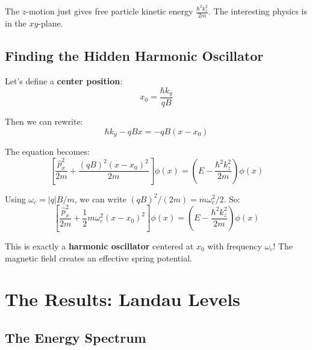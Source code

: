 \documentclass[11pt,a4paper]{article}
\let\oldsection\section
\renewcommand{\section}{\needspace{5\baselineskip}\oldsection}
\let\oldsubsection\subsection
\renewcommand{\subsection}{\needspace{4\baselineskip}\oldsubsection}
\theoremstyle{definition}
\theoremstyle{remark}
\begin{document}
The $z$-motion just gives free particle kinetic energy $\frac{\hbar^2 k_z^2}{2m}$. The interesting physics is in the $xy$-plane.

\subsection{Finding the Hidden Harmonic Oscillator}

Let's define a \textbf{center position}:
\begin{equation}
    x_0 = \frac{\hbar k_y}{qB}
\end{equation}

Then we can rewrite:
\begin{equation}
    \hbar k_y - qBx = -qB(x - x_0)
\end{equation}

The equation becomes:
\begin{equation}
    \left[\frac{\hat{p}_x^2}{2m} + \frac{(qB)^2(x - x_0)^2}{2m}\right]\phi(x) = \left(E - \frac{\hbar^2 k_z^2}{2m}\right) \phi(x)
\end{equation}

Using $\omega_c = |q|B/m$, we can write $(qB)^2/(2m) = m\omega_c^2/2$. So:
\begin{equation}
    \boxed{\left[\frac{\hat{p}_x^2}{2m} + \frac{1}{2}m\omega_c^2(x - x_0)^2\right]\phi(x) = \left(E - \frac{\hbar^2 k_z^2}{2m}\right) \phi(x)}
\end{equation}

\begin{keyresult}
This is exactly a \textbf{harmonic oscillator} centered at $x_0$ with frequency $\omega_c$! The magnetic field creates an effective spring potential.
\end{keyresult}

\section{The Results: Landau Levels}

\subsection{The Energy Spectrum}
\end{document}
